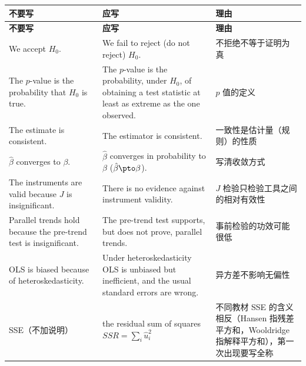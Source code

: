 {\renewcommand{\arraystretch}{1.15}\begin{longtable}{@{}>{\raggedright\arraybackslash}p{4.6cm}>{\raggedright\arraybackslash}p{6.6cm}>{\raggedright\arraybackslash}p{4.5cm}@{}}
\toprule
\textbf{不要写} & \textbf{应写} & \textbf{理由}\\
\midrule
\endfirsthead
\toprule
\textbf{不要写} & \textbf{应写} & \textbf{理由}\\
\midrule
\endhead
\bottomrule
\endlastfoot
We accept $H_0$. & We fail to reject (do not reject) $H_0$. & 不拒绝不等于证明为真\\
\addlinespace[2pt]
The $p$-value is the probability that $H_0$ is true. & The $p$-value is the probability, under $H_0$, of obtaining a test statistic at least as extreme as the one observed. & $p$ 值的定义\\
\addlinespace[2pt]
The estimate is consistent. & The estimator is consistent. & 一致性是估计量（规则）的性质\\
\addlinespace[2pt]
$\hat\beta$ converges to $\beta$. & $\hat\beta$ converges in probability to $\beta$ ($\hat\beta\pto\beta$). & 写清收敛方式\\
\addlinespace[2pt]
The instruments are valid because $J$ is insignificant. & There is no evidence against instrument validity. & $J$ 检验只检验工具之间的相对有效性\\
\addlinespace[2pt]
Parallel trends hold because the pre-trend test is insignificant. & The pre-trend test supports, but does not prove, parallel trends. & 事前检验的功效可能很低\\
\addlinespace[2pt]
OLS is biased because of heteroskedasticity. & Under heteroskedasticity OLS is unbiased but inefficient, and the usual standard errors are wrong. & 异方差不影响无偏性\\
\addlinespace[2pt]
SSE（不加说明） & the residual sum of squares $SSR=\sum_i\hat u_i^2$ & 不同教材 SSE 的含义相反（Hansen 指残差平方和，Wooldridge 指解释平方和），第一次出现要写全称\\
\end{longtable}}
